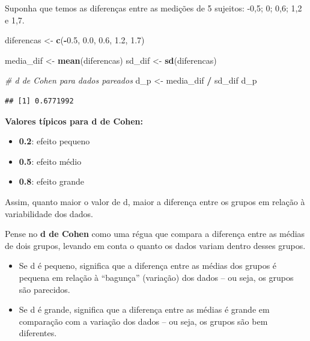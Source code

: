 \documentclass[
]{book}
\newenvironment{Shaded}{\begin{snugshade}}{\end{snugshade}}
\newcommand{\CommentTok}[1]{\textcolor[rgb]{0.56,0.35,0.01}{\textit{#1}}}
\newcommand{\FloatTok}[1]{\textcolor[rgb]{0.00,0.00,0.81}{#1}}
\newcommand{\FunctionTok}[1]{\textcolor[rgb]{0.13,0.29,0.53}{\textbf{#1}}}
\newcommand{\NormalTok}[1]{#1}
\newcommand{\OtherTok}[1]{\textcolor[rgb]{0.56,0.35,0.01}{#1}}
\newcommand{\SpecialCharTok}[1]{\textcolor[rgb]{0.81,0.36,0.00}{\textbf{#1}}}
\providecommand{\tightlist}{%
  \setlength{\itemsep}{0pt}\setlength{\parskip}{0pt}}
\begin{document}
Suponha que temos as diferenças entre as medições de 5 sujeitos: -0,5; 0; 0,6; 1,2 e 1,7.

\begin{Shaded}
\begin{Highlighting}[]
\NormalTok{diferencas }\OtherTok{\textless{}{-}} \FunctionTok{c}\NormalTok{(}\SpecialCharTok{{-}}\FloatTok{0.5}\NormalTok{, }\FloatTok{0.0}\NormalTok{, }\FloatTok{0.6}\NormalTok{, }\FloatTok{1.2}\NormalTok{, }\FloatTok{1.7}\NormalTok{)}

\NormalTok{media\_dif }\OtherTok{\textless{}{-}} \FunctionTok{mean}\NormalTok{(diferencas)}
\NormalTok{sd\_dif }\OtherTok{\textless{}{-}} \FunctionTok{sd}\NormalTok{(diferencas)}

\CommentTok{\# d de Cohen para dados pareados}
\NormalTok{d\_p }\OtherTok{\textless{}{-}}\NormalTok{ media\_dif }\SpecialCharTok{/}\NormalTok{ sd\_dif}
\NormalTok{d\_p}
\end{Highlighting}
\end{Shaded}

\begin{verbatim}
## [1] 0.6771992
\end{verbatim}

\textbf{Valores típicos para d de Cohen:}

\begin{itemize}
\tightlist
\item
  \textbf{0.2}: efeito pequeno\\
\item
  \textbf{0.5}: efeito médio\\
\item
  \textbf{0.8}: efeito grande
\end{itemize}

Assim, quanto maior o valor de d, maior a diferença entre os grupos em relação à variabilidade dos dados.

Pense no \textbf{d de Cohen} como uma régua que compara a diferença entre as médias de dois grupos, levando em conta o quanto os dados variam dentro desses grupos.

\begin{itemize}
\tightlist
\item
  Se d é pequeno, significa que a diferença entre as médias dos grupos é pequena em relação à ``bagunça'' (variação) dos dados -- ou seja, os grupos são parecidos.
\item
  Se d é grande, significa que a diferença entre as médias é grande em comparação com a variação dos dados -- ou seja, os grupos são bem diferentes.
\end{itemize}
\end{document}
